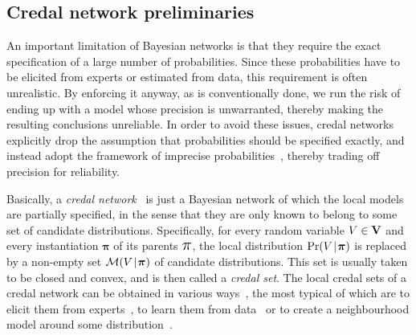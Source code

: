 \documentclass[10pt,a4paper]{paper}
\theoremstyle{definition}
\newcommand{\vbpi}{\boldsymbol\pi}
\newcommand{\vpi}{\scalebox{1.4}{\ensuremath\pi}}
\newcommand{\credal}{\mathcal{M}}
\newcommand{\newmid}{\hspace{0.9pt}\vert\hspace{0.9pt}}
\begin{document}
\subsection{Credal network preliminaries}\label{sec:credal:prelim}

An important limitation of Bayesian networks is that they require the exact specification of a large number of probabilities. Since these probabilities have to be elicited from experts or estimated from data, this requirement is often unrealistic. By enforcing it anyway, as is conventionally done, we run the risk  of ending up with a model whose precision is unwarranted, thereby making the resulting conclusions unreliable. In order to avoid these issues, credal networks explicitly drop the assumption that probabilities should be specified exactly, and instead adopt the framework of imprecise probabilities~\cite{augustin2013:itip,Walley:1991vk,Walley:2000ef}, thereby trading off precision for reliability.  

Basically, a \emph{credal network}~\cite{Antonucci:2014ty,Cozman:2000ug,Cozman:2005ct} is just a Bayesian network of which the local models are partially specified, in the sense that they are only known to belong to some set of candidate distributions. Specifically, for every random variable $V\in{\bf V}$ and every instantiation $\vbpi$ of its parents $\vpi$, the local distribution $\Pr(V\newmid\vbpi)$ is replaced by a non-empty set $\credal(V\newmid\vbpi)$ of candidate distributions. This set is usually taken to be closed and convex, and is then called a \emph{credal set}. The local credal sets of a credal network can be obtained in various ways~\cite{Walley:1991vk}, the most typical of which are to elicit them from experts~\cite{Piatti:2010vd}, to learn them from data~\cite{Bernard:2005hd,Walley:1996vt} or to create a neighbourhood model around some distribution~\cite{berger1985statistical}.
\end{document}
